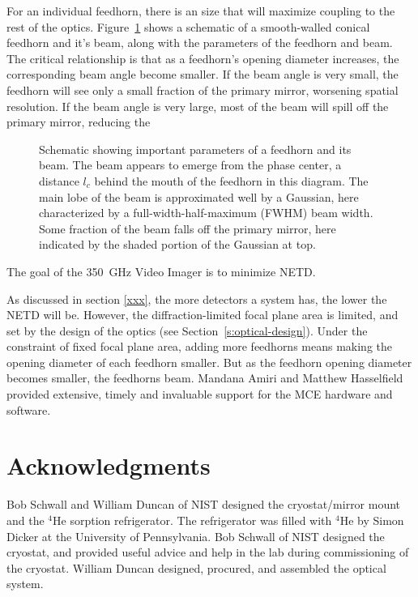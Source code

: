 \documentclass[10pt,twocolumn,article]{memoir}
\newcommand*{\figref}[1]{Figure~\ref{#1}}
\newcommand*{\sectionref}[1]{Section~\ref{#1}}
\newcommand*{\NETD}{{\small NETD}\xspace}
\newcommand*{\FWHM}{{\small FWHM}\xspace}
\newcommand*{\He}[1]{$^{#1}$He\xspace}
\newcommand*{\Imager}{350~GHz Video Imager\xspace}
\begin{document}
For an individual feedhorn, there is an size that will maximize coupling to the rest of the optics.
\figref{fig:feedhorn-parms} shows a schematic of a smooth-walled conical feedhorn and it's beam, along with the parameters of the feedhorn and beam.
The critical relationship is that as a feedhorn's opening diameter increases, the corresponding beam angle become smaller.
If the beam angle is very small, the feedhorn will see only a small fraction of the primary mirror, worsening spatial resolution.
If the beam angle is very large, most of the beam will spill off the primary mirror, reducing the 

\begin{figure}
\centering

\caption{Schematic showing important parameters of a feedhorn and its beam. The beam appears to emerge from the phase center, a distance $l_c$ behind the mouth of the feedhorn in this diagram. The main lobe of the beam is approximated well by a Gaussian, here characterized by a full-width-half-maximum (\FWHM) beam width. Some fraction of the beam falls off the primary mirror, here indicated by the shaded portion of the Gaussian at top.}
\label{fig:feedhorn-parms}
\end{figure}

The goal of the \Imager is to minimize \NETD.

As discussed in section \ref{xxx}, the more detectors a system has, the lower the \NETD will be.
However, the diffraction-limited focal plane area is limited, and set by the design of the optics (see \sectionref{s:optical-design}).
Under the constraint of fixed focal plane area, adding more feedhorns means making the opening diameter of each feedhorn smaller.
But as the feedhorn opening diameter becomes smaller, the feedhorns beam.
Mandana Amiri and Matthew Hasselfield provided extensive, timely and invaluable support for the MCE hardware and software.
 
\section{Acknowledgments}

Bob Schwall and William Duncan of NIST designed the cryostat/mirror mount and the \He4 sorption refrigerator.
The refrigerator was filled with \He4 by Simon Dicker at the University of Pennsylvania.
Bob Schwall of NIST designed the cryostat, and provided useful advice and help in the lab during commissioning of the cryostat.
William Duncan designed, procured, and assembled the optical system.
\end{document}
